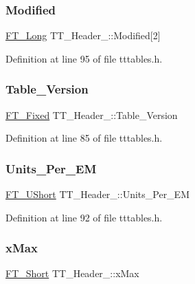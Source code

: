 \subsubsection{\texorpdfstring{Modified}{Modified}}
{\footnotesize\ttfamily \mbox{\hyperlink{fttypes_8h_a7fa72a1f0e79fb1860c5965789024d6f}{F\+T\+\_\+\+Long}} T\+T\+\_\+\+Header\+\_\+\+::\+Modified\mbox{[}2\mbox{]}}



Definition at line 95 of file tttables.\+h.

\mbox{\label{struct_t_t___header___ab14622e8f8f80ee8361f4847cf9c36e1}} 
\subsubsection{\texorpdfstring{Table\_Version}{Table\_Version}}
{\footnotesize\ttfamily \mbox{\hyperlink{fttypes_8h_a5f5a679cc09f758efdd0d1c5feed3c3d}{F\+T\+\_\+\+Fixed}} T\+T\+\_\+\+Header\+\_\+\+::\+Table\+\_\+\+Version}



Definition at line 85 of file tttables.\+h.

\mbox{\label{struct_t_t___header___a594567319e6b6b5a823567279d26857d}} 
\subsubsection{\texorpdfstring{Units\_Per\_EM}{Units\_Per\_EM}}
{\footnotesize\ttfamily \mbox{\hyperlink{fttypes_8h_a937f6c17cf5ffd09086d8610c37b9f58}{F\+T\+\_\+\+U\+Short}} T\+T\+\_\+\+Header\+\_\+\+::\+Units\+\_\+\+Per\+\_\+\+EM}



Definition at line 92 of file tttables.\+h.

\mbox{\label{struct_t_t___header___a593b9cc3e11532972a7fc96944dd1ae9}} 
\subsubsection{\texorpdfstring{xMax}{xMax}}
{\footnotesize\ttfamily \mbox{\hyperlink{fttypes_8h_aa7279be89046a2563cd3d4d6651fbdcf}{F\+T\+\_\+\+Short}} T\+T\+\_\+\+Header\+\_\+\+::x\+Max}



